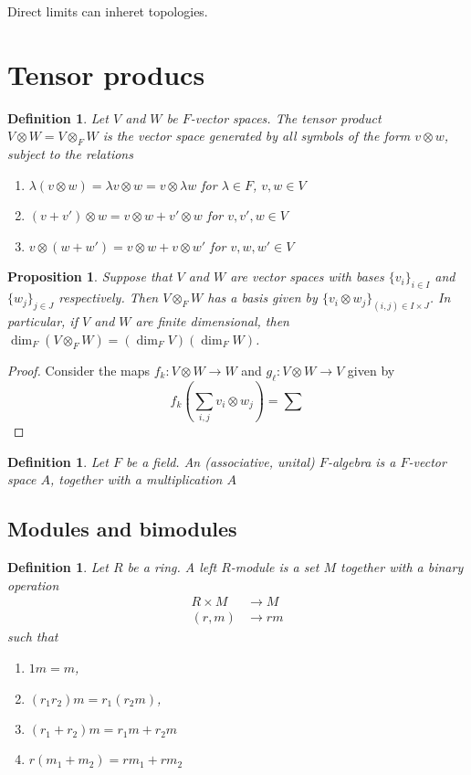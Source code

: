 \documentclass[12pt]{report}
\theoremstyle{plain}
\newtheorem{defn}[thm]{Definition}
\newtheorem{prop}[thm]{Proposition}
\begin{document}
Direct limits can inheret topologies.



\section{Tensor producs}

\begin{defn}
Let $V$ and $W$ be $F$-vector spaces. The tensor product $V \otimes W = V
\otimes_F W$ is the vector space generated by all symbols of the form $v
\otimes w$, subject to the relations
\begin{enumerate}
\item $\lambda (v \otimes w) = \lambda v \otimes w = v \otimes \lambda w$
for $\lambda \in F$, $v, w \in V$
\item $(v + v') \otimes w = v \otimes w + v' \otimes w$ for $v, v', w \in
V$
\item $v \otimes (w + w') = v \otimes w + v \otimes w'$ for $v, w, w' \in
V$
\end{enumerate}
\end{defn}

\begin{prop}
Suppose that $V$ and $W$ are vector spaces with bases $\{v_i\}_{i \in I}$
and $\{w_j\}_{j \in J}$ respectively. Then $V \otimes_F W$ has a basis given
by $\{v_i \otimes w_j\}_{(i, j) \in I \times J}$. In particular, if $V$ and
$W$ are finite dimensional, then $\dim_F(V \otimes_F W) = (\dim_F V)(\dim_F
W)$.
\end{prop}
\begin{proof}
Consider the maps $f_k : V \otimes W \to W$ and $g_\ell: V \otimes W \to V$
given by 
\[f_k(\sum_{i,j} v_i \otimes w_j) = \sum  \]
\end{proof}

\begin{defn}
Let $F$ be a field. An (associative, unital) $F$-algebra is a $F$-vector
space $A$, together with a multiplication $A$
\end{defn}




\iffalse

\subsection{Modules and bimodules}

\begin{defn}
Let $R$ be a ring. A left $R$-module is a set $M$ together with a binary
operation
\begin{align*}
R \times M &\to M \\
(r, m) &\to rm
\end{align*}
such that
\begin{enumerate}[1. ]
\item $1 m = m$, 
\item $(r_1 r_2) m = r_1 (r_2 m)$, 
\item $(r_1 + r_2)m = r_1m + r_2 m$
\item $r(m_1 + m_2) = rm_1 + rm_2$
\end{enumerate}
\end{defn}
\end{document}
